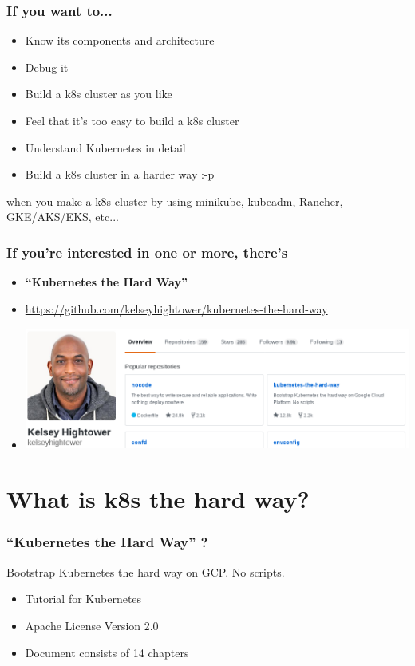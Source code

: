 \documentclass[aspectratio=169,11pt,hyperref={colorlinks=true}]{beamer}
\begin{document}
\begin{frame}
  \frametitle{If you want to...}
  \begin{itemize}
    \item Know its components and architecture
    \item Debug it
    \item Build a k8s cluster as you like
    \item Feel that it's too easy to build a k8s cluster
    \item Understand Kubernetes in detail
    \item Build a k8s cluster in a harder way :-p
  \end{itemize}
  when you make a k8s cluster by using minikube, kubeadm, Rancher, GKE/AKS/EKS, etc...
\end{frame}

\begin{frame}
  \frametitle{If you're interested in one or more, there's}
  \begin{itemize}
    \item[] \Huge{\bf ``Kubernetes the Hard Way''}\large{}
    \item \url{https://github.com/kelseyhightower/kubernetes-the-hard-way}
    \item[] \includegraphics[height=40mm]{images/kelseyhightower_overview.png}
  \end{itemize}
\end{frame}

\section{What is k8s the hard way?}
\begin{frame}
  \frametitle{``Kubernetes the Hard Way'' ?}
  Bootstrap Kubernetes the hard way on GCP. No scripts.
  \begin{itemize}
    \item Tutorial for Kubernetes
    \item Apache License Version 2.0
    \item Document consists of 14 chapters
  \end{itemize}
\end{frame}
\end{document}
